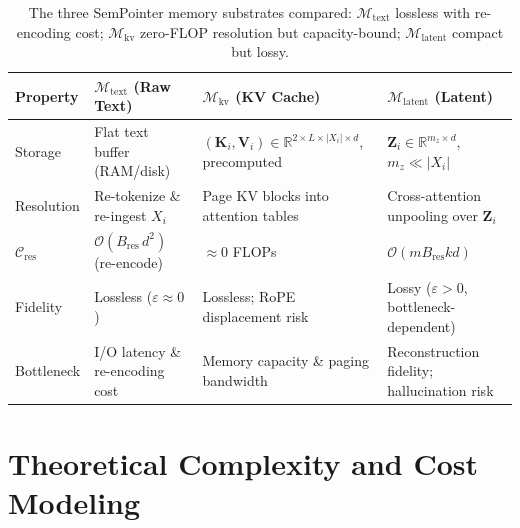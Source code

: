 \documentclass[conference]{IEEEtran}
\begin{document}
{\begin{table}[t]
\centering
\renewcommand{\arraystretch}{0.95}
\setlength{\tabcolsep}{3pt}
{\footnotesize
\begin{tabular}{@{}lp{3.2cm}p{3.2cm}p{3.5cm}@{}}
\toprule
\textbf{Property}
  & \textbf{$\mathcal{M}_{\text{text}}$ (Raw Text)}
  & \textbf{$\mathcal{M}_{\text{kv}}$ (KV Cache)}
  & \textbf{$\mathcal{M}_{\text{latent}}$ (Latent)} \\
\midrule
Storage
  & Flat text buffer (RAM/disk)
  & $(\mathbf{K}_i,\mathbf{V}_i)\!\in\!\mathbb{R}^{2\times L\times|X_i|\times d}$, precomputed
  & $\mathbf{Z}_i\!\in\!\mathbb{R}^{m_z\times d}$, $m_z\!\ll\!|X_i|$ \\
Resolution
  & Re-tokenize \& re-ingest $X_i$
  & Page KV blocks into attention tables
  & Cross-attention unpooling over $\mathbf{Z}_i$ \\
$\mathcal{C}_{\mathrm{res}}$
  & $\mathcal{O}(B_{\mathrm{res}}\,d^2)$ (re-encode)
  & $\approx 0$ FLOPs
  & $\mathcal{O}(m B_{\mathrm{res}} k d)$ \\
Fidelity
  & Lossless ($\varepsilon\approx 0$)
  & Lossless; RoPE displacement risk
  & Lossy ($\varepsilon>0$, bottleneck-dependent) \\
Bottleneck
  & I/O latency \& re-encoding cost
  & Memory capacity \& paging bandwidth
  & Reconstruction fidelity; hallucination risk \\
\bottomrule
\end{tabular}
}
\caption{The three SemPointer memory substrates compared: $\mathcal{M}_{\text{text}}$ lossless with re-encoding cost; $\mathcal{M}_{\text{kv}}$ zero-FLOP resolution but capacity-bound; $\mathcal{M}_{\text{latent}}$ compact but lossy.}
\label{tab:substrates}
\end{table}

\enlargethispage{2\baselineskip}
\section{Theoretical Complexity and Cost Modeling}\label{sec:complexity}

}
\end{document}
